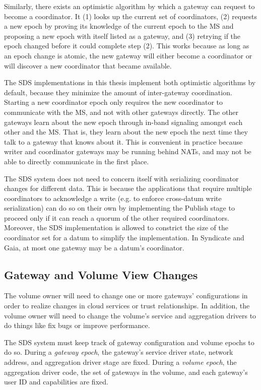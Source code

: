 Similarly, there exists an optimistic algorithm by which a gateway can request
to become a coordinator.  It (1) looks up the current set of coordinators, (2)
requests a new epoch by proving its knowledge of the current epoch to the MS
and proposing a new epoch with itself listed as a gateway, and (3) retrying if the epoch
changed before it could complete step (2).  This works because as long as an epoch change
is atomic, the new gateway will either become a coordinator or will discover a
new coordinator that became available.

The SDS implementations in this thesis implement both optimistic algorithms by
default, because they minimize the amount of inter-gateway coordination.
Starting a new coordinator epoch only requires the new coordinator to communicate with the MS, and not with
other gateways directly.  The other gateways learn about the new epoch through in-band signaling amongst each
other and the MS.  That is, they learn about the new epoch the next time they talk to
a gateway that knows about it.  This is convenient in practice because writer
and coordinator gateways may be running behind NATs, and may not be able to
directly communicate in the first place.

The SDS system does not need to concern itself with serializing coordinator
changes for different data.  This is because the applications that require
multiple coordinators to acknowledge a write (e.g. to enforce cross-datum write
serialization) can do so on their own by implementing the
Publish stage to proceed only if it can reach a quorum of the other required
coordinators.  Moreover, the SDS implementation is allowed to constrict the size
of the coordinator set for a datum to simplify the implementation.
In Syndicate and Gaia, at most one gateway may be a datum's coordinator.

\subsection{Gateway and Volume View Changes}

The volume owner will need to change one or more gateways'
configurations in order to realize changes in cloud services or trust relationships.
In addition, the volume owner will need to 
change the volume's service and aggregation drivers to do things like fix bugs or improve
performance.

The SDS system must keep track of gateway configuration and volume 
epochs to do so.  During a \emph{gateway epoch}, the gateway's service
driver state, network address, and aggregation driver stage are fixed.  During
a \emph{volume epoch}, the aggregation driver code, the set of gateways in the
volume, and each gateway's user ID and capabilities are fixed.

